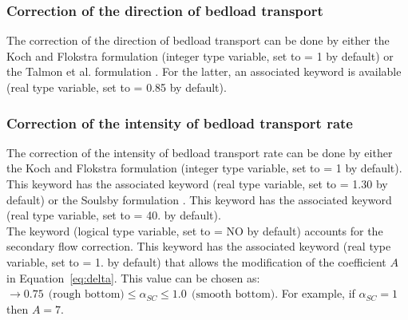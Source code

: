 \subsubsection{Correction of the direction of bedload transport}
The correction of the direction of bedload transport can be done by either the Koch and Flokstra formulation  (integer type variable, set to {\ttfamily = 1} by default) or the Talmon et al. formulation . For the latter, an associated keyword is available  (real type variable, set to {\ttfamily = 0.85} by default).

\subsubsection{Correction of the intensity of bedload transport rate}
The correction of the intensity of bedload transport rate can be done by either the Koch and Flokstra formulation  (integer type variable, set to {\ttfamily = 1} by default). This keyword has the associated keyword  (real type variable, set to {\ttfamily = 1.30} by default) or the Soulsby formulation . This keyword has the associated keyword  (real type variable, set to {\ttfamily = 40.} by default).\\

The keyword  (logical type variable, set to {\ttfamily = NO} by default) accounts for the secondary flow correction. This keyword has the associated keyword  (real type variable, set to {\ttfamily = 1.} by default) that allows the modification of the coefficient $A$ in Equation~\ref{eq:delta}. This value can be chosen as: $\rightarrow 0.75~~\text{(rough bottom)} \leq \alpha_{SC} \leq 1.0~~\text{(smooth bottom)}$. For example, if $\alpha_{SC} = 1$ then $A = 7$.


